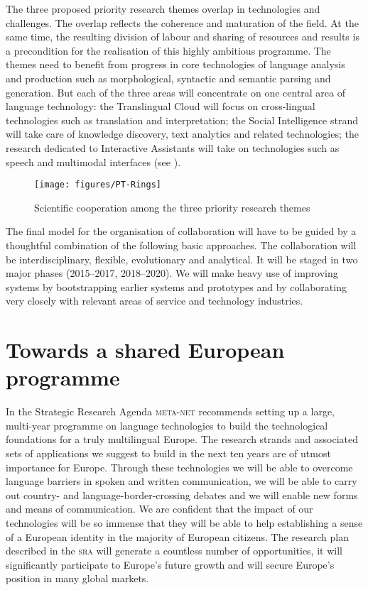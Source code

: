 \documentclass[output=paper]{LSP/langsci}
\begin{document}
The three proposed priority research themes overlap in technologies
and challenges. The overlap reflects the coherence and maturation of
the field. At the same time, the resulting division of labour and
sharing of resources and results is a precondition for the realisation
of this highly ambitious programme. The themes need to benefit from
progress in core technologies of language analysis and production such
as morphological, syntactic and semantic parsing and generation. But
each of the three areas will concentrate on one central area of
language technology: the Translingual Cloud will focus on
cross-lingual technologies such as translation and interpretation; the
Social Intelligence strand will take care of knowledge discovery, text
analytics and related technologies; the research dedicated to
Interactive Assistants will take on technologies such as speech and
multimodal interfaces (see ).

\begin{figure*}[htb]
  \center
  \texttt{[image: figures/PT-Rings]}
  \caption{Scientific cooperation among the three priority research themes}
  \label{fig:priority-themes}
\end{figure*}

\newpage %
The final model for the organisation of collaboration will have to be
guided by a thoughtful combination of the following basic
approaches. The collaboration will be interdisciplinary, flexible,
evolutionary and analytical. It will be staged in two major phases
(2015--2017, 2018--2020). We will make heavy use of improving systems
by bootstrapping earlier systems and prototypes and by collaborating
very closely with relevant areas of service and technology industries.

\section{Towards a shared European programme}
\label{sec:summary}

In the Strategic Research Agenda \textsc{meta-net} recommends setting up a
large, multi-year programme on language technologies to build the
technological foundations for a truly multilingual Europe. The
research strands and associated sets of applications we suggest to
build in the next ten years are of utmost importance for
Europe. Through these technologies we will be able to overcome
language barriers in spoken and written communication, we will be able
to carry out country- and language-border-crossing debates and we will
enable new forms and means of communication. We are confident that the
impact of our technologies will be so immense that they will be able
to help establishing a sense of a European identity in the majority of
European citizens. The research plan described in the \textsc{sra} will
generate a countless number of opportunities, it will significantly
participate to Europe's future growth and will secure Europe's
position in many global markets.
\end{document}
